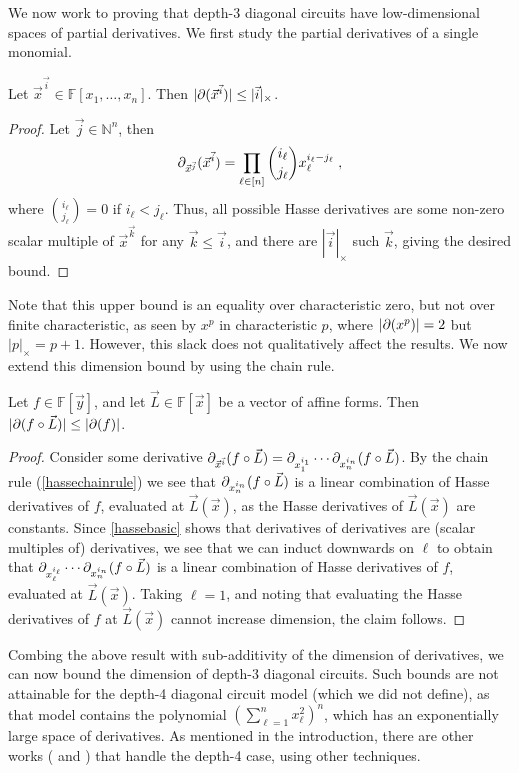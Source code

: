 \documentclass[letterpaper,11pt]{article}
\numberwithin{equation}{section}
\theoremstyle{plain}
\theoremstyle{remark}
\newcommand{\F}{\mathbb{F}}
\newcommand{\N}{\mathbb{N}}
\begin{document}
We now work to proving that depth-3 diagonal circuits have low-dimensional spaces of partial derivatives.  We first study the partial derivatives of a single monomial.

\begin{lemma}
	\label{hassedimmonomial}
	Let $\vec{x}^{\vec{i}}\in\F[x_1,\ldots,x_n]$.  Then $|\partial(\vec{x}^{\vec{i}})|\le|\vec{i}|_\times$.
\end{lemma}
\begin{proof}
	Let $\vec{j}\in\N^n$, then
	\[
		\partial_{\vec{x}^{\vec{j}}}(\vec{x}^{\vec{i}})=\prod_{\ell\in[n]}\binom{i_\ell}{j_\ell}x_\ell^{i_\ell-j_\ell}\;,
	\]
	where $\binom{i_\ell}{j_\ell}=0$ if $i_\ell<j_\ell$.  Thus, all possible Hasse derivatives are some non-zero scalar multiple of $\vec{x}^{\vec{k}}$ for any $\vec{k}\le\vec{i}$, and there are $|\vec{i}|_\times$ such $\vec{k}$, giving the desired bound.
\end{proof}

Note that this upper bound is an equality over characteristic zero, but not over finite characteristic, as seen by $x^p$ in characteristic $p$, where $|\partial(x^p)|=2$ but $|p|_\times=p+1$. However, this slack does not qualitatively affect the results. We now extend this dimension bound by using the chain rule.

\begin{lemma}
	\label{hassedimlinearsub}
	Let $f\in\F[\vec{y}]$, and let $\vec{L}\in\F[\vec{x}]$ be a vector of affine forms.  Then $|\partial(f\circ \vec{L})|\le|\partial(f)|$.
\end{lemma}
\begin{proof}
	Consider some derivative $\partial_{\vec{x}^{\vec{i}}}(f\circ\vec{L})=
	\partial_{x_1^{i_1}}\cdots\partial_{x_n^{i_n}}(f\circ\vec{L})$.  By the chain rule (\autoref{hassechainrule}) we see that $\partial_{x_n^{i_n}}(f\circ\vec{L})$ is a linear combination of Hasse derivatives of $f$, evaluated at $\vec{L}(\vec{x})$, as the Hasse derivatives of $\vec{L}(\vec{x})$ are constants. Since \autoref{hassebasic} shows that derivatives of derivatives are (scalar multiples of) derivatives, we see that we can induct downwards on $\ell$ to obtain that $\partial_{x_\ell^{i_\ell}}\cdots\partial_{x_n^{i_n}}(f\circ\vec{L})$ is a linear combination of Hasse derivatives of $f$, evaluated at $\vec{L}(\vec{x})$.  Taking $\ell=1$, and noting that evaluating the Hasse derivatives of $f$ at $\vec{L}(\vec{x})$ cannot increase dimension, the claim follows.
\end{proof}

Combing the above result with sub-additivity of the dimension of derivatives, we can now bound the dimension of depth-3 diagonal circuits.  Such bounds are not attainable for the depth-4 diagonal circuit model (which we did not define), as that model contains the polynomial $(\sum_{\ell=1}^n x_\ell^2)^n$, which has an exponentially large space of derivatives.  As mentioned in the introduction, there are other works (\cite{AgrawalSS12} and \cite{ForbesShpilka12a}) that handle the depth-4 case, using other techniques.
\end{document}
